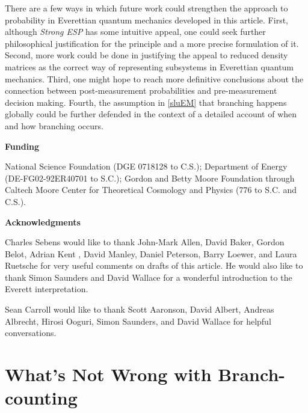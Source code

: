 \documentclass[onecolumn,secnumarabic,amsmath,amssymb,balancelastpage,nofootinbib]{article}
\begin{document}
There are a few ways in which future work could strengthen the approach to probability in Everettian quantum mechanics developed in this article.  First, although \emph{Strong ESP} has some intuitive appeal, one could seek further philosophical justification for the principle and a more precise formulation of it.  Second, more work could be done in justifying the appeal to reduced density matrices as the correct way of representing subsystems in Everettian quantum mechanics.  Third, one might hope to reach more definitive conclusions about the connection between post-measurement probabilities and pre-measurement decision making.  Fourth, the assumption in \textsection \ref{sluEM} that branching happens globally could be further defended in the context of a detailed account of when and how branching occurs.

\begin{center}
\textbf{Funding}
\end{center}

National Science Foundation (DGE 0718128 to C.S.);  Department of Energy (DE-FG02-92ER40701 to S.C.); Gordon and Betty Moore Foundation through Caltech Moore Center for Theoretical Cosmology and Physics (776 to S.C. and C.S.).

\begin{center}
\textbf{Acknowledgments}
\end{center}

Charles Sebens would like to thank John-Mark Allen, David Baker, Gordon Belot, Adrian Kent \citep[see][]{kent2014}, David Manley, Daniel Peterson, Barry Loewer, and Laura Ruetsche for very useful comments on drafts of this article.  He would also like to thank Simon Saunders and David Wallace for a wonderful introduction to the Everett interpretation.

Sean Carroll would like to thank Scott Aaronson, David Albert, Andreas Albrecht, Hirosi Ooguri, Simon Saunders, and David Wallace for helpful conversations.

\appendix

\section{What's Not Wrong with Branch-counting}\label{notaproblem}
\end{document}
